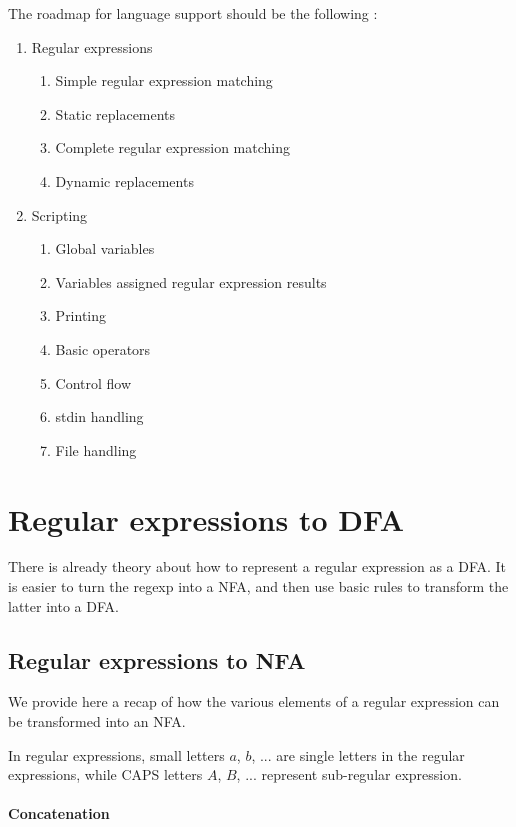\documentclass[11pt,a4paper]{report}
\begin{document}
The roadmap for language support should be the following :
\begin{enumerate}
\item Regular expressions
	\begin{enumerate}
	\item Simple regular expression matching
	\item Static replacements
	\item Complete regular expression matching
	\item Dynamic replacements	
	\end{enumerate}
\item Scripting
	\begin{enumerate}
	\item Global variables
	\item Variables assigned regular expression results
	\item Printing
	\item Basic operators
	\item Control flow
	\item stdin handling
	\item File handling
	\end{enumerate}
\end{enumerate}

\chapter{Regular expressions to DFA}

There is already theory about how to represent a regular expression as a DFA. It is easier to turn the regexp into a NFA, and then use basic rules to transform the latter into a DFA.

\section{Regular expressions to NFA}

We provide here a recap of how the various elements of a regular expression can be transformed into an NFA.

In regular expressions, small letters $a$, $b$, ... are single letters in the regular expressions, while CAPS letters $A$, $B$, ... represent sub-regular expression.

\subsubsection{Concatenation}
\end{document}
